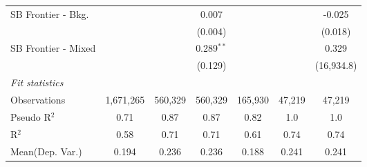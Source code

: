 \begin{tabular}{lcccccc}
   SB Frontier - Bkg.   &                &                & 0.007          &                &                & -0.025\\   
                        &                &                & (0.004)        &                &                & (0.018)\\   
   SB Frontier - Mixed  &                &                & 0.289$^{**}$   &                &                & 0.329\\   
                        &                &                & (0.129)        &                &                & (16,934.8)\\   
   \midrule
   \emph{Fit statistics}\\
   Observations         & 1,671,265      & 560,329        & 560,329        & 165,930        & 47,219         & 47,219\\  
   Pseudo R$^2$         & 0.71           & 0.87           & 0.87           & 0.82           & 1.0            & 1.0\\  
   R$^2$                & 0.58           & 0.71           & 0.71           & 0.61           & 0.74           & 0.74\\  
Mean(Dep. Var.) & 0.194 & 0.236 & 0.236 & 0.188 & 0.241 & 0.241 \\
   

\end{tabular}
